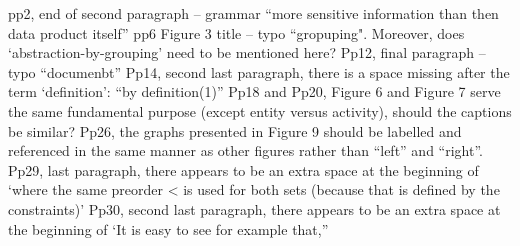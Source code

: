 \documentclass{article}
\begin{document}
pp2, end of second paragraph – grammar “more sensitive information than then data product itself”
pp6 Figure 3 title – typo “gropuping".  Moreover, does ‘abstraction-by-grouping’ need to be mentioned here?
Pp12, final paragraph – typo “documenbt”
Pp14, second last paragraph, there is a space missing after the term ‘definition’: “by definition(1)”
Pp18 and Pp20, Figure 6 and Figure 7 serve the same fundamental purpose (except entity versus activity), should the captions be similar?
Pp26, the graphs presented in Figure 9 should be labelled and referenced in the same manner as other figures rather than “left” and “right”.
Pp29, last paragraph, there appears to be an extra space at the beginning of ‘where the same preorder < is used for both sets (because that is defined by the constraints)’
Pp30, second last paragraph, there appears to be an extra space at the beginning of ‘It is easy to see for example that,”






\end{document}
